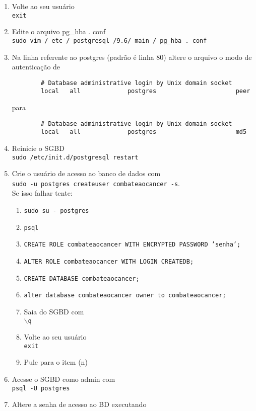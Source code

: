 \documentclass[12pt,a4paper]{article}
\begin{document}
\begin{enumerate}
\begin{enumerate}
		\item Volte ao seu usuário\\
		\texttt{exit}
		\item Edite o arquivo pg\_hba . conf\\
		\texttt{sudo vim / etc / postgresql /9.6/ main / pg\_hba . conf}
		\item Na linha referente ao postgres (padrão é linha 80) altere o arquivo o modo de autenticação de
		\begin{verbatim}
		# Database administrative login by Unix domain socket
		local   all             postgres                      peer
		\end{verbatim}
		para
		\begin{verbatim}
		# Database administrative login by Unix domain socket
		local   all             postgres                      md5
		\end{verbatim}
		\item Reinicie o SGBD\\
		\texttt{sudo /etc/init.d/postgresql restart}
		\item Crie o usuário de acesso ao banco de dados com  \\
		\texttt{sudo -u postgres createuser combateaocancer -s}.\\
		Se isso falhar tente:
		\begin{enumerate}
			\item \texttt{sudo su - postgres}
			\item \texttt{psql}
			\item \texttt{CREATE ROLE combateaocancer WITH ENCRYPTED PASSWORD 'senha';}
			\item \texttt{ALTER ROLE combateaocancer WITH LOGIN CREATEDB;}
			\item \texttt{CREATE DATABASE combateaocancer;}
			\item \texttt{alter database combateaocancer owner to combateaocancer;}
			\item Saia do SGBD com \\
			\texttt{$\backslash$q}
			\item Volte ao seu usuário\\
			\texttt{exit}
			\item Pule para o item (n)
		\end{enumerate}
		\item Acesse o SGBD como admin com \\
		\texttt{psql -U postgres}
		\item Altere a senha de acesso ao BD executando \\

\end{enumerate}
\end{enumerate}
\end{document}
